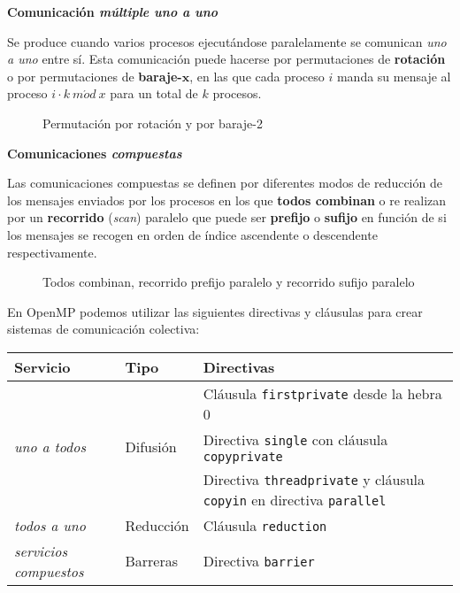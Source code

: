 \textbf{Comunicación \textit{múltiple uno a uno}}

Se produce cuando varios procesos ejecutándose paralelamente se comunican \textit{uno a uno} entre sí.
Esta comunicación puede hacerse por permutaciones de \textbf{rotación} o por permutaciones de \textbf{baraje-}$\boldsymbol{x}$, en las que cada proceso $i$ manda su mensaje al proceso $i\cdot k\ m\acute{o}d\ x$ para un total de $k$ procesos.

\begin{figure}[h]
\begin{center}


\end{center}
\caption{Permutación por rotación y por baraje-2}
\end{figure}

\textbf{Comunicaciones \textit{compuestas}}

Las comunicaciones compuestas se definen por diferentes modos de reducción de los mensajes enviados por los procesos en los que \textbf{todos combinan} o re realizan por un \textbf{recorrido} (\textit{scan}) paralelo que puede ser \textbf{prefijo} o \textbf{sufijo} en función de si los mensajes se recogen en orden de índice ascendente o descendente respectivamente.

\begin{figure}
\begin{center}



\end{center}
\caption{Todos combinan, recorrido prefijo paralelo y recorrido sufijo paralelo}
\end{figure}

En OpenMP podemos utilizar las siguientes directivas y cláusulas para crear sistemas de comunicación colectiva:

\begin{center}
\begin{tabular}{l l l}
	\textbf{Servicio} & \textbf{Tipo} & \textbf{Directivas} \\
	\toprule
	\multirow{3}{*}{\textit{uno a todos}} &          & Cláusula \texttt{firstprivate} desde la hebra 0 \\
	                                      & Difusión & Directiva \texttt{single} con cláusula \texttt{copyprivate} \\
	                                      &          & Directiva \texttt{threadprivate} y cláusula \texttt{copyin} en directiva \texttt{parallel} \\
	\midrule
	\textit{todos a uno} & Reducción & Cláusula \texttt{reduction} \\
	\midrule
	\textit{servicios compuestos} & Barreras & Directiva \texttt{barrier}
\end{tabular}
\end{center}

